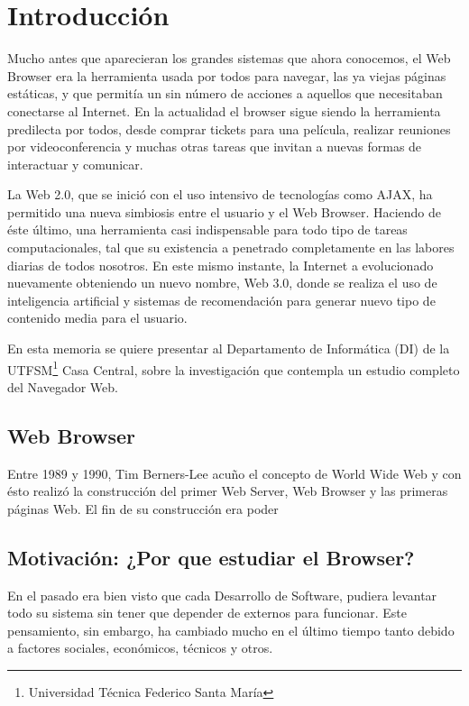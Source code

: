 \chapter{Introducción}
\label{chap:intro}

Mucho antes que aparecieran los grandes sistemas que ahora conocemos, el Web Browser era la herramienta usada por todos para navegar, las ya viejas páginas estáticas, y que permitía un sin número de acciones a aquellos que necesitaban conectarse al Internet. En la actualidad el browser sigue siendo la herramienta predilecta por todos, desde comprar tickets para una película, realizar reuniones por videoconferencia y muchas otras tareas que invitan a nuevas formas de interactuar y comunicar.


La Web 2.0, que se inició con el uso intensivo de tecnologías como AJAX, ha permitido una nueva simbiosis entre el usuario y el Web Browser. Haciendo de éste último, una herramienta casi indispensable para todo tipo de tareas computacionales, tal que su existencia a penetrado completamente en las labores diarias de todos nosotros. En este mismo instante, la Internet a evolucionado nuevamente obteniendo un nuevo nombre, Web 3.0, donde se realiza el uso de inteligencia artificial y sistemas de recomendación para generar nuevo tipo de contenido media para el usuario.


En esta memoria se quiere presentar al Departamento de Informática (DI) de la UTFSM\footnote{Universidad Técnica Federico Santa María} Casa Central, sobre la investigación que contempla un estudio completo del Navegador Web.

\section{Web Browser}
\label{chap:WB}
Entre 1989 y 1990, Tim Berners-Lee acuño el concepto de World Wide Web y con ésto realizó la construcción del primer Web Server, Web Browser y las primeras páginas Web. El fin de su construcción era poder


\section{Motivación: ¿Por que estudiar el Browser?}
\label{chap:motiv}
En el pasado era bien visto que cada Desarrollo de Software, pudiera levantar todo su sistema sin tener que depender de externos para funcionar. Este pensamiento, sin embargo, ha cambiado mucho en el último tiempo tanto debido a factores sociales, económicos, técnicos y otros. 

